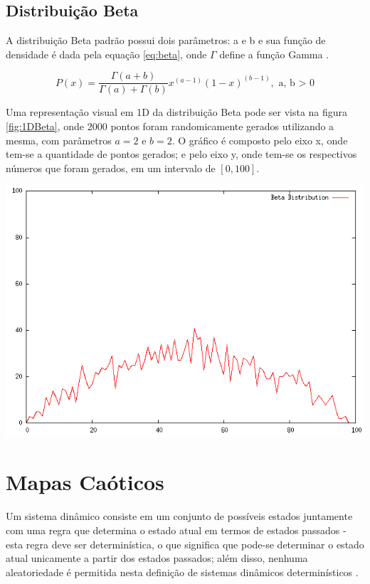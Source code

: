 \subsection{Distribuição Beta}

A distribuição Beta padrão possui dois parâmetros: a e b e sua função de densidade é dada pela equação \ref{eq:beta}, onde $\Gamma$ define a função Gamma \cite{ali}.

\begin{equation}
\label{eq:beta}
P(x) = \frac{\Gamma(a+b)}{\Gamma(a) + \Gamma(b)}x^{(a-1)}(1-x)^{(b-1)}, \text{ a, b > 0}
\end{equation}

Uma representação visual em 1D da distribuição Beta pode ser vista na figura \ref{fig:1DBeta}, onde 2000 pontos foram randomicamente gerados utilizando a mesma, com parâmetros $a = 2$ e $b = 2$. O gráfico é composto pelo eixo x, onde tem-se a quantidade de pontos gerados; e pelo eixo y, onde tem-se os respectivos números que foram gerados, em um intervalo de $[0, 100]$.

{
    \centering
    \includegraphics[width=0.5\linewidth]{figuras/DistribuicaoBeta.png}
    \label{fig:1DBeta}
}

\section{Mapas Caóticos}

Um sistema dinâmico consiste em um conjunto de possíveis estados juntamente com uma regra que determina o estado atual em termos de estados passados - esta regra deve ser determinística, o que significa que pode-se determinar o estado atual unicamente a partir dos estados passados; além disso, nenhuma aleatoriedade é permitida nesta definição de sistemas dinâmicos determinísticos \cite{alligood}.


